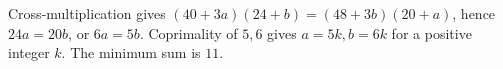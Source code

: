 Cross-multiplication gives $(40+3a)(24+b)=(48+3b)(20+a)$, hence $24a=20b$, or $6a=5b$. Coprimality of $5,6$ gives $a=5k,b=6k$ for a positive integer $k$. The minimum sum is $\boxed{11}$.
